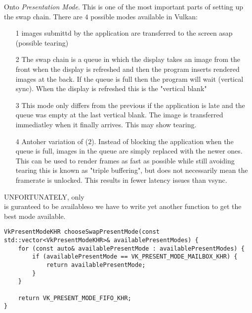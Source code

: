 \par Onto \emph{Presentation Mode}. This is one of the most important parts of setting up the swap chain. There are $4$ possible modes available in Vulkan:

\begin{itemize}
    \item[1]  images submittd by the application are transferred to the screen asap (possible tearing)
    \item[2]  The swap chain is a queue in which the display takes an image from the front when the display is refreshed and then the program inserts rendered images at the back. If the queue is full then the program will wait (vertical sync). When the display is refreshed this is the "vertical blank"
    \item[3]  This mode only differs from the previous if the application is late and the queue was empty at the last vertical blank. The image is transferred immediatley when it finally arrives. This may show tearing.
    \item[4]  Antoher variation of ($2$). Instead of blocking the application when the queue is full, images in the queue are simply replaced with the newer ones. This can be used to render frames as fast as possible while still avoiding tearing this is known as "triple buffering", but does not necessarily mean the framerate is unlocked. This results in fewer latency issues than vsync.
\end{itemize}

\par UNFORTUNATELY, only \\ 
 is guranteed to be availableso we have to write yet another function to get the best mode available.

\begin{center}
\begin{minipage}{0.95\linewidth}
\begin{lstlisting}
VkPresentModeKHR chooseSwapPresentMode(const std::vector<VkPresentModeKHR>& availablePresentModes) {
    for (const auto& availablePresentMode : availablePresentModes) {
        if (availablePresentMode == VK_PRESENT_MODE_MAILBOX_KHR) {
            return availablePresentMode;
        }
    }

    return VK_PRESENT_MODE_FIFO_KHR;
}
\end{lstlisting}
\end{minipage}
\end{center}

